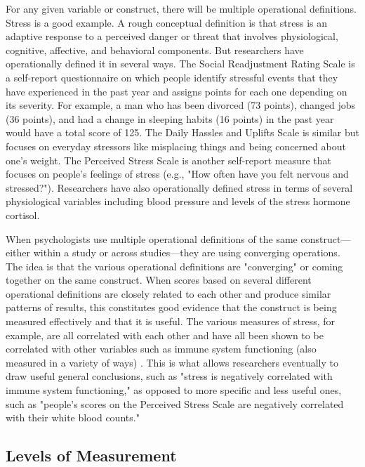 For any given variable or construct, there will be multiple operational definitions. Stress is a good example. A rough conceptual definition is that stress is an adaptive response to a perceived danger or threat that involves physiological, cognitive, affective, and behavioral components. But researchers have operationally defined it in several ways. The Social Readjustment Rating Scale is a self-report questionnaire on which people identify stressful events that they have experienced in the past year and assigns points for each one depending on its severity. For example, a man who has been divorced (73 points), changed jobs (36 points), and had a change in sleeping habits (16 points) in the past year would have a total score of 125. The Daily Hassles and Uplifts Scale is similar but focuses on everyday stressors like misplacing things and being concerned about one's weight. The Perceived Stress Scale is another self-report measure that focuses on people's feelings of stress (e.g., "How often have you felt nervous and stressed?"). Researchers have also operationally defined stress in terms of several physiological variables including blood pressure and levels of the stress hormone cortisol.

When psychologists use multiple operational definitions of the same construct—either within a study or across studies—they are using converging operations. The idea is that the various operational definitions are "converging" or coming together on the same construct. When scores based on several different operational definitions are closely related to each other and produce similar patterns of results, this constitutes good evidence that the construct is being measured effectively and that it is useful. The various measures of stress, for example, are all correlated with each other and have all been shown to be correlated with other variables such as immune system functioning (also measured in a variety of ways) \citep{segerstrom_psychological_2004}. This is what allows researchers eventually to draw useful general conclusions, such as "stress is negatively correlated with immune system functioning," as opposed to more specific and less useful ones, such as "people's scores on the Perceived Stress Scale are negatively correlated with their white blood counts."

\subsection{Levels of Measurement}


